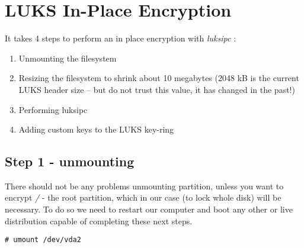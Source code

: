 \chapter{LUKS In-Place Encryption}
\label{luksipc}
It takes 4 steps to perform an in place encryption with {\it luksipc} \cite{luksipc}:
\begin{enumerate}
    \item Unmounting the filesystem
    \item Resizing the filesystem to shrink about 10 megabytes (2048 kB is the current LUKS header size -- but do not trust this value, it has changed in the past!)
    \item Performing luksipc
    \item Adding custom keys to the LUKS key-ring
\end{enumerate}



\section{Step 1 - unmounting}
There should not be any problems unmounting partition, unless you want to encrypt {\it /} - the root partition, which in our case (to lock whole disk) will be necessary.
To do so we need to restart our computer and boot any other or live distribution capable of completing these next steps.
\begin{lstlisting}[columns=fixed,basicstyle=\ttfamily\footnotesize,tabsize=4,backgroundcolor=\color{yellow!10}]
# umount /dev/vda2
\end{lstlisting}



